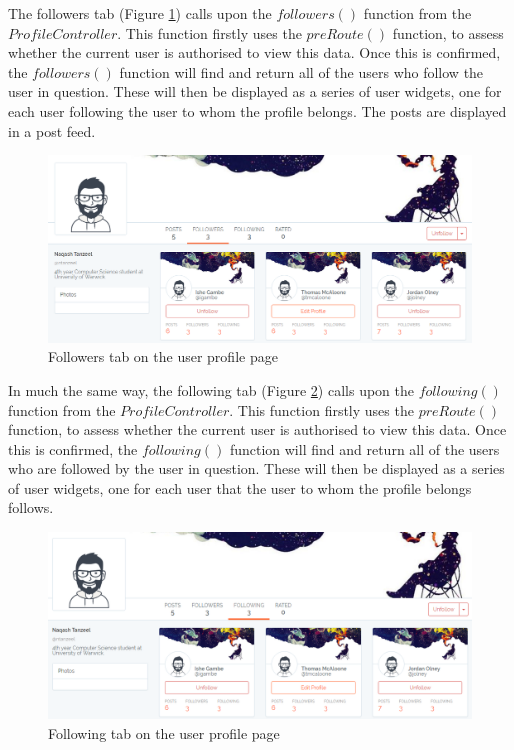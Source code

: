 The followers tab (Figure \ref{fig:ProfileFollowers}) calls upon the \(followers()\) function from the \(ProfileController\). This function firstly uses the \(preRoute()\) function, to assess whether the current user is authorised to view this data. Once this is confirmed, the \(followers()\) function will find and return all of the users who follow the user in question. These will then be displayed as a series of user widgets, one for each user following the user to whom the profile belongs. The posts are displayed in a post feed.

\begin{figure}[H]
\centering
\includegraphics[width=\textwidth]{Images/Implementation/ProfileFollowers}
\caption{Followers tab on the user profile page}
\label{fig:ProfileFollowers}
\end{figure}

In much the same way, the following tab (Figure \ref{fig:ProfileFollowing}) calls upon the \(following()\) function from the \(ProfileController\). This function firstly uses the \(preRoute()\) function, to assess whether the current user is authorised to view this data. Once this is confirmed, the \(following()\) function will find and return all of the users who are followed by the user in question. These will then be displayed as a series of user widgets, one for each user that the user to whom the profile belongs follows.

\begin{figure}[H]
\centering
\includegraphics[width=\textwidth]{Images/Implementation/ProfileFollowing}
\caption{Following tab on the user profile page}
\label{fig:ProfileFollowing}
\end{figure}

